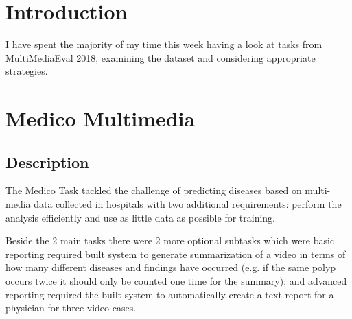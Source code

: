 \section{Introduction}
I have spent the majority of my time this week having a look at tasks from MultiMediaEval 2018\cite{mediaeval18}, examining the dataset and considering appropriate strategies.

\section{Medico Multimedia\cite{medico18}}
\subsection{Description}
The Medico Task tackled the challenge of predicting diseases based on multi-media data collected in hospitals with two additional requirements: perform the analysis efficiently and use as little data as possible for training.

Beside the 2 main tasks there were 2 more optional subtasks which were basic reporting required built system to generate summarization of a video in terms of how many different diseases and findings have occurred (e.g. if the same polyp occurs twice it should only be counted one time for the summary); and advanced reporting required the built system to automatically create a text-report for a physician for three video cases.

